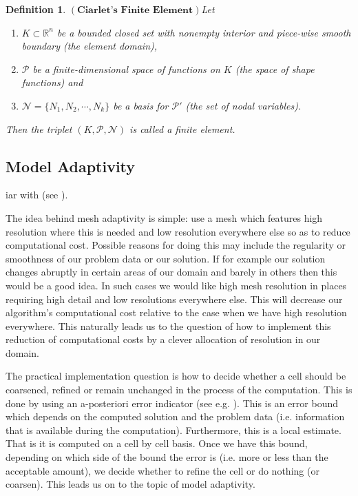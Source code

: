 \documentclass[12pt,a4paper]{article}
\newtheorem{definition}[theorem]{Definition}
\theoremstyle{definition}
\begin{document}
\begin{definition}{$\left(\textbf{Ciarlet's Finite Element}\right)$}\label{defn_finite-element}
	Let
\begin{enumerate}
\item $K\subset \mathbb{R}^n$ be a bounded closed set with nonempty interior and piece-wise smooth boundary (the element domain),
\item $\mathcal{P}$ be a finite-dimensional space of functions on $K$ (the space of shape functions) and
\item $\mathcal{N}=\lbrace N_1,N_2,\cdots,N_k \rbrace$ be a basis for $\mathcal{P}'$ (the set of nodal variables).
\end{enumerate}
Then the triplet $\left(K,\mathcal{P},\mathcal{N}\right)$ is called a finite element.
\end{definition}


\subsection{Model Adaptivity}
iar with (see \cite{ern2013theory}).   

The idea behind mesh adaptivity is simple: use a mesh which features high resolution  where this is needed and low resolution everywhere else so as to reduce computational cost.  Possible reasons for doing this may include the regularity or smoothness of our problem data or our solution.  If for example our solution changes abruptly in certain areas of our domain and barely in others then this would be a good idea.  In such cases we would like high mesh resolution in places requiring high detail and low resolutions everywhere else.  This will decrease our algorithm's computational cost relative to the case when we have high resolution everywhere.  This naturally leads us to the question of how to implement this reduction of computational costs by a clever allocation of resolution in our domain.

The practical implementation question is how to decide whether a cell should be coarsened, refined or remain unchanged in the process of the computation.  This is done by using an a-posteriori error indicator (see e.g. \cite{braess2007finite}).  This is an error bound which depends on the computed solution and the problem data (i.e. information that is available during the computation).  Furthermore, this is a local estimate.  That is it is computed on a cell by cell basis.  Once we have this bound, depending on which side of the bound the error is (i.e. more or less than the acceptable amount),  we decide whether to refine the cell or do nothing (or coarsen).  This leads us on to the topic of model adaptivity.
\end{document}
